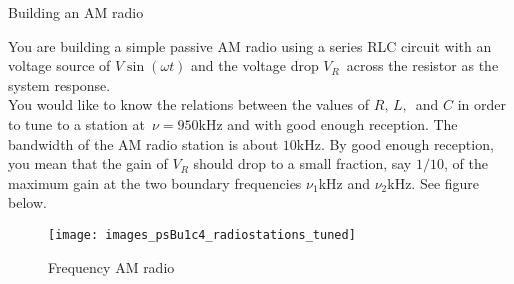 \begin{problem}
  Building an AM radio
\end{problem}
You are building a simple passive AM radio using a series RLC circuit
with an voltage source of $V \sin⁡(\omega t)$
and the voltage drop $V_R\,$ across the resistor as the system response.\\

You would like to know the relations between the values of $R,\,L,\,$ and $C$
in order to tune to a station at $\, \nu =950$kHz and with good enough reception.
The bandwidth of the AM radio station is about $10$kHz.
By good enough reception, you mean that the gain of $V_R$ should drop to a small fraction,
say $1/10$, of the maximum gain at the two boundary frequencies $\nu _ 1$kHz and $\nu_ 2$kHz.
See figure below.

\begin{figure}[ht!]
  \centering
  \texttt{[image: images\_psBu1c4\_radiostations\_tuned]}
  \caption{Frequency AM radio}
\end{figure}

